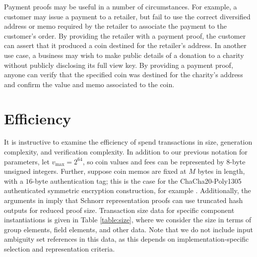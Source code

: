 \documentclass{llncs}
\begin{document}
Payment proofs may be useful in a number of circumstances.
For example, a customer may issue a payment to a retailer, but fail to use the correct diversified address or memo required by the retailer to associate the payment to the customer's order.
By providing the retailer with a payment proof, the customer can assert that it produced a coin destined for the retailer's address.
In another use case, a business may wish to make public details of a donation to a charity without publicly disclosing its full view key.
By providing a payment proof, anyone can verify that the specified coin was destined for the charity's address and confirm the value and memo associated to the coin.


\section{Efficiency}

It is instructive to examine the efficiency of spend transactions in size, generation complexity, and verification complexity.
In addition to our previous notation for parameters, let $v_{\text{max}} = 2^{64}$, so coin values and fees can be represented by $8$-byte unsigned integers.
Further, suppose coin memos are fixed at $M$ bytes in length, with a $16$-byte authentication tag; this is the case for the ChaCha20-Poly1305 authenticated symmetric encryption construction, for example \cite{chachapoly}.
Additionally, the arguments in \cite{schnorr} imply that Schnorr representation proofs can use truncated hash outputs for reduced proof size.
Transaction size data for specific component instantiations is given in Table \ref{table:size}, where we consider the size in terms of group elements, field elements, and other data.
Note that we do not include input ambiguity set references in this data, as this depends on implementation-specific selection and representation criteria.
\end{document}
